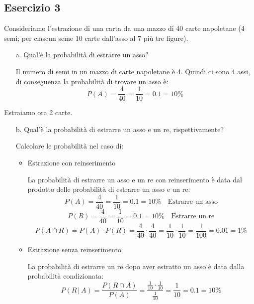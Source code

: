 \documentclass[a4paper]{article}
\theoremstyle{break}
\theoremstyle{break}
\theoremstyle{break}
\theoremstyle{break}
\begin{document}
\subsection{Esercizio 3}
Consideriamo l’estrazione di una carta da una mazzo di 40 carte napoletane (4 semi; per
ciascun seme 10 carte dall’asso al 7 più tre figure).
\begin{enumerate}
	\item[a.] Qual'è la probabilità di estrarre un asso?

	      \vspace{1em}
	      \noindent Il numero di semi in un mazzo di carte napoletane è 4. Quindi ci sono 4
	      assi, di conseguenza la probabilità di trovare un asso è:
	      \[
		      P(A) = \frac{4}{40} = \frac{1}{10} = 0.1 = 10\%
	      \]
\end{enumerate}
Estraiamo ora 2 carte.
\begin{enumerate}
	\item[b.] Qual'è la probabilità di estrarre un asso e un re, rispettivamente?

	      \noindent Calcolare le probabilità nel caso di:
	      \begin{itemize}
		      \item Estrazione con reinserimento

		            \vspace{1em}
		            \noindent La probabilità di estrarre un asso e un re con reinserimento è data dal
		            prodotto delle probabilità di estrarre un asso e un re:
		            \[
			            P(A) = \frac{4}{40} = \frac{1}{10} = 0.1 = 10\% \quad \text{Estrarre un asso}
		            \]
		            \[
			            P(R) = \frac{4}{40} = \frac{1}{10} = 0.1 = 10\% \quad \text{Estrarre un re}
		            \]
		            \[
			            P(A \cap R) = P(A) \cdot P(R) = \frac{4}{40} \cdot \frac{4}{40} = \frac{1}{10} \cdot \frac{1}{10} = \frac{1}{100} = 0.01 = 1\%
		            \]
		      \item Estrazione senza reinserimento

		            \vspace{1em}
		            La probabilità di estrarre un re dopo aver estratto un asso è data dalla
		            probabilità condizionata:
		            \[
			            P(R\,|\,A) = \frac{P(R \cap A)}{P(A)} = \frac{\frac{1}{10} \cdot \frac{1}{10}}{\frac{1}{10}} = \frac{1}{10} = 0.1 = 10\%
		            \]
	      \end{itemize}
\end{enumerate}
\end{document}
